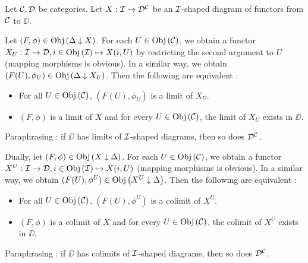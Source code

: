 \begin{prop}
  
  Let $\mathcal{C}, \mathcal{D}$ be categories.
  Let $X : \mathcal{I} \to \mathcal{D}^{\mathcal{C}}$ be an $\mathcal{I}$-shaped diagram of functors from 
  $\mathcal{C}$ to $\DD$.

  Let $(F,\phi) \in \mathrm{Obj}\left(\Delta\downarrow X\right)$.
  For each $U \in \mathrm{Obj}\left(\mathcal{C}\right)$,
  we obtain a functor $X_U : \mathcal{I} \to \mathcal{D}, i \in \mathrm{Obj}\left(\mathcal{I}\right) \mapsto X(i,U)$
  by restricting the second argument to $U$
  (mapping morphisms is obvious). 
  In a similar way, we obtain $(F(U),\phi_U) \in \mathrm{Obj}\left(\Delta\downarrow X_U\right)$.
  Then the following are equivalent : 
  \begin{itemize}
    \item For all $U \in \mathrm{Obj}\left(\mathcal{C}\right)$, 
    $(F(U),\phi_U)$ is a limit of $X_U$.
    \item $(F,\phi)$ is a limit of $X$ and for every $U\in\mathrm{Obj}\left(\mathcal{C}\right)$,
    the limit of $X_U$ exists in $\DD$.
  \end{itemize}
  Paraphrasing : if $\DD$ has limits of $\mathcal{I}$-shaped diagrams,
  then so does $\mathcal{D}^{\mathcal{C}}$.

  Dually, let $(F,\phi) \in \mathrm{Obj}\left(X\downarrow\Delta\right)$.
  For each $U \in \mathrm{Obj}\left(\mathcal{C}\right)$,
  we obtain a functor $X^U : \mathcal{I} \to \mathcal{D}, i \in \mathrm{Obj}\left(\mathcal{I}\right) \mapsto X(i,U)$
  (mapping morphisms is obvious). 
  In a similar way, we obtain $(F(U),\phi^U) \in \mathrm{Obj}\left(X^U\downarrow\Delta\right)$.
  Then the following are equivalent : 
  \begin{itemize}
    \item For all $U \in \mathrm{Obj}\left(\mathcal{C}\right)$, 
    $(F(U),\phi^U)$ is a colimit of $X^U$.
    \item $(F,\phi)$ is a colimit of $X$ and for every $U \in \mathrm{Obj}\left(\mathcal{C}\right)$,
    the colimit of $X^U$ exists in $\DD$.
  \end{itemize}
  Paraphrasing : if $\DD$ has colimits of $\mathcal{I}$-shaped diagrams,
  then so does $\mathcal{D}^{\mathcal{C}}$.
\end{prop}
